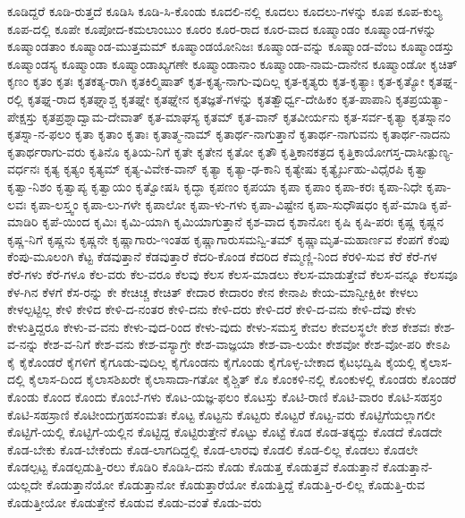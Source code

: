 {ಕೂಡಿದ್ದರೆ
ಕೂಡಿ-ರುತ್ತದೆ
ಕೂಡಿಸಿ
ಕೂಡಿ-ಸಿ-ಕೊಂಡು
ಕೂದಲಿ-ನಲ್ಲಿ
ಕೂದಲು
ಕೂದಲು-ಗಳನ್ನು
ಕೂಪ
ಕೂಪ-ಕುಲ್ಯ
ಕೂಪ-ದಲ್ಲಿ
ಕೂಪೇ
ಕೂಪೋದ-ಕಮಲಾಂಬುಂ
ಕೂರಂ
ಕೂರ-ರಾದ
ಕೂರ-ವಾದ
ಕೂಷ್ಮಾಂಡಂ
ಕೂಷ್ಮಾಂಡ-ಗಳನ್ನು
ಕೂಷ್ಮಾಂಡತಾಂ
ಕೂಷ್ಮಾಂಡ-ಮುತ್ತಮಮ್
ಕೂಷ್ಮಾಂಡಯೋನಿಜಃ
ಕೂಷ್ಮಾಂಡ-ವನ್ನು
ಕೂಷ್ಮಾಂಡ-ವೆಂಬ
ಕೂಷ್ಮಾಂಡಸ್ತು
ಕೂಷ್ಮಾಂಡಸ್ಯ
ಕೂಷ್ಮಾಂಡಾ
ಕೂಷ್ಮಾಂಡಾಖ್ಯಗಣೇ
ಕೂಷ್ಮಾಂಡಾನಾಂ
ಕೂಷ್ಮಾಂಡಾ-ನಾಮ-ದಾನೇನ
ಕೂಷ್ಮಾಂಡೋ
ಕೃಚಿತ್
ಕೃಣಂ
ಕೃತಂ
ಕೃತಃ
ಕೃತಕತ್ಯ-ರಾಗಿ
ಕೃತಕಿಲ್ಮಿಷಾತ್
ಕೃತ-ಕೃತ್ಯ-ನಾಗು-ವುದಿಲ್ಲ
ಕೃತ-ಕೃತ್ಯರು
ಕೃತ-ಕೃತ್ಯಾಃ
ಕೃತ-ಕೃತ್ಯೋ
ಕೃತಘ್ನ-ರಲ್ಲಿ
ಕೃತಘ್ನ-ರಾದ
ಕೃತಘ್ನಾಶ್ಚ
ಕೃತಘ್ನೇ
ಕೃತಘ್ನೇನ
ಕೃತಜ್ಞತೆ-ಗಳನ್ನು
ಕೃತತ್ವೌರ್ಧ್ವ-ದೇಹಿಕಂ
ಕೃತ-ಪಾಪಾನಿ
ಕೃತಪ್ರಯತ್ಯಾ-ಪೇಕ್ಷಸ್ತು
ಕೃತಪ್ರಶ್ನಾದ್ವಾಮ-ದೇವಾತ್
ಕೃತ-ಮಾಘಸ್ಯ
ಕೃತಮ್
ಕೃತ-ವಾನ್
ಕೃತವೀರ್ಯನು
ಕೃತ-ಸರ್ವ-ಕೃತ್ಯಾ
ಕೃತಸ್ನಾನಂ
ಕೃತಸ್ನಾ-ನ-ಫಲಂ
ಕೃತಾ
ಕೃತಾಂ
ಕೃತಾಃ
ಕೃತಾತ್ಮ-ನಾಮ್
ಕೃತಾರ್ಥ-ನಾಗುತ್ತಾನೆ
ಕೃತಾರ್ಥ-ನಾಗುವನು
ಕೃತಾರ್ಥ-ನಾದನು
ಕೃತಾರ್ಥರಾಗು-ವರು
ಕೃತಿನೊ
ಕೃತಿಯ-ನಿಗೆ
ಕೃತೇ
ಕೃತೇನ
ಕೃತೋ
ಕೃತೌ
ಕೃತ್ತಿಕಾನಕತ್ರದ
ಕೃತ್ತಿಕಾಯೋಗಸ್ತ-ದಾಸೀತ್ಪುಣ್ಯ-ವರ್ಧನಃ
ಕೃತ್ಯ
ಕೃತ್ಯಂ
ಕೃತ್ಯಮ್
ಕೃತ್ಯ-ವಿವೇಕ-ವಾನ್
ಕೃತ್ಯಾ
ಕೃತ್ಯಾ-ಢ-ಕಾನಿ
ಕೃತ್ಯೇಷು
ಕೃತ್ಯೈರ್ಬಹು-ವಿಧೈರಪಿ
ಕೃತ್ವಾ
ಕೃತ್ವಾ-ನಿಶಂ
ಕೃತ್ವಾಪ್ಯ
ಕೃತ್ವಾಯಂ
ಕೃತ್ವೋಷಸಿ
ಕೃದ್ಧಾ
ಕೃಪಣಂ
ಕೃಪಯಾ
ಕೃಪಾ
ಕೃಪಾಂ
ಕೃಪಾ-ಕರಃ
ಕೃಪಾ-ನಿಧೇ
ಕೃಪಾ-ಲವಃ
ಕೃಪಾ-ಲಸ್ತ್ವಂ
ಕೃಪಾ-ಲು-ಗಳೇ
ಕೃಪಾಲೋ
ಕೃಪಾ-ಳು-ಗಳು
ಕೃಪಾ-ವಿಷ್ಟೇನ
ಕೃಪಾ-ಸುಧೌಷಧಂ
ಕೃಪೆ-ಮಾಡಿ
ಕೃಪೆ-ಮಾಡಿರಿ
ಕೃಪೆ-ಯಿಂದ
ಕೃಮಿಃ
ಕೃಮಿ-ಯಾಗಿ
ಕೃಮಿಯಾಗುತ್ತಾನೆ
ಕೃಶ-ವಾದ
ಕೃಶಾನೋಃ
ಕೃಷಿ
ಕೃಷಿ-ಪರಃ
ಕೃಷ್ಣ
ಕೃಷ್ಣನ
ಕೃಷ್ಣ-ನಿಗೆ
ಕೃಷ್ಣನು
ಕೃಷ್ಣನೇ
ಕೃಷ್ಣಾಗಾರು-ಇಂತಹ
ಕೃಷ್ಣಾಗಾರುಸಮನ್ವಿ-ತಮ್
ಕೃಷ್ಣಾಮೃತ-ಮಹಾರ್ಣವ
ಕೆಂಪಗೆ
ಕೆಂಪು
ಕೆಂಪು-ಮೂಲಂಗಿ
ಕೆಟ್ಟ
ಕೆಡವುತ್ತಾನೆ
ಕೆಡವುತ್ತಾರೆ
ಕೆದರಿ-ಕೊಂಡ
ಕೆದರಿದ
ಕೆಮ್ಮಣ್ಣಿ-ನಿಂದ
ಕೆರಳಿ-ಸುವ
ಕೆರೆ
ಕೆರೆ-ಗಳ
ಕೆರೆ-ಗಳು
ಕೆರೆ-ಗಳೂ
ಕೆಲ-ವರು
ಕೆಲ-ವರೂ
ಕೆಲವು
ಕೆಲಸ
ಕೆಲಸ-ಮಾಡಲು
ಕೆಲಸ-ಮಾಡುತ್ತೇವೆ
ಕೆಲಸ-ವನ್ನೂ
ಕೆಲಸವೂ
ಕೆಳ-ಗಿನ
ಕೆಳಗೆ
ಕೆಸ-ರನ್ನು
ಕೇ
ಕೇಚಿಚ್ಚ
ಕೇಚಿತ್
ಕೇದಾರ
ಕೇದಾರಂ
ಕೇನ
ಕೇನಾಪಿ
ಕೇಯ-ಮಾನ್ವೀಕ್ಷಿಕೀ
ಕೇಳಲು
ಕೇಳಲ್ಪಟ್ಟಿಲ್ಲ
ಕೇಳಿ
ಕೇಳಿದ
ಕೇಳಿ-ದ-ನಂತರ
ಕೇಳಿ-ದನು
ಕೇಳಿ-ದರು
ಕೇಳಿ-ದರೆ
ಕೇಳಿ-ದ-ವನು
ಕೇಳಿ-ದೆವು
ಕೇಳು
ಕೇಳುತ್ತಿದ್ದರೂ
ಕೇಳು-ವ-ವನು
ಕೇಳು-ವುದ-ರಿಂದ
ಕೇಳು-ವುದು
ಕೇಳು-ಸಮಸ್ತ
ಕೇವಲ
ಕೇವಲಸ್ಥಲೇ
ಕೇಶ
ಕೇಶವಃ
ಕೇಶ-ವ-ನನ್ನು
ಕೇಶ-ವ-ನಿಗೆ
ಕೇಶ-ವನು
ಕೇಶ-ವಸ್ಯಾಗ್ರೇ
ಕೇಶ-ವಾಜ್ಞಯಾ
ಕೇಶ-ವಾ-ಲಯೇ
ಕೇಶವೋ
ಕೇಶ-ವೋ-ಪರಿ
ಕೇಽಪಿ
ಕೈ
ಕೈಕೊಂಡರೆ
ಕೈಗಳಿಗೆ
ಕೈಗೂಡು-ವುದಿಲ್ಲ
ಕೈಗೊಂಡನು
ಕೈಗೊಂಡು
ಕೈಗೊಳ್ಳ-ಬೇಕಾದ
ಕೈಟಭದ್ವಿಷಿ
ಕೈಯಲ್ಲಿ
ಕೈಲಾಸ-ದಲ್ಲಿ
ಕೈಲಾಸ-ದಿಂದ
ಕೈಲಾಸಶಿಖರೇ
ಕೈಲಾಸಾದಾ-ಗತೋ
ಕೈಶ್ಚಿತ್
ಕೊ
ಕೊಂಕಳಿ-ನಲ್ಲಿ
ಕೊಂಕುಳಲ್ಲಿ
ಕೊಂಡರು
ಕೊಂಡರೆ
ಕೊಂಡು
ಕೊಂದ
ಕೊಂದು
ಕೊಂಬೆ-ಗಳು
ಕೊಟ-ಯಜ್ಞ-ಫಲಂ
ಕೊಟಸ್ತು
ಕೊಟಿ-ರಾಣಿ
ಕೊಟಿ-ವಾರಂ
ಕೊಟಿ-ಸಹಸ್ರಂ
ಕೊಟಿ-ಸಹಸ್ರಾಣಿ
ಕೊಟೀಂದುಗ್ರಹಸಂಮತಃ
ಕೊಟ್ಟ
ಕೊಟ್ಟನು
ಕೊಟ್ಟರು
ಕೊಟ್ಟರೆ
ಕೊಟ್ಟ-ವರು
ಕೊಟ್ಟಿಗೆಯಲ್ಲಾಗಲೀ
ಕೊಟ್ಟಿಗೆ-ಯಲ್ಲಿ
ಕೊಟ್ಟಿಗೆ-ಯಲ್ಲಿನ
ಕೊಟ್ಟಿದ್ದ
ಕೊಟ್ಟಿರುತ್ತೇನೆ
ಕೊಟ್ಟು
ಕೊಟ್ಟೆ
ಕೊಡ
ಕೊಡ-ತಕ್ಕದ್ದು
ಕೊಡದೆ
ಕೊಡದೇ
ಕೊಡ-ಬೇಕು
ಕೊಡ-ಬೇಕೆಂದು
ಕೊಡ-ಲಾಗದಿದ್ದಲ್ಲಿ
ಕೊಡ-ಲಾರವು
ಕೊಡಲಿ
ಕೊಡ-ಲಿಲ್ಲ
ಕೊಡಲು
ಕೊಡಲೇ
ಕೊಡಲ್ಪಟ್ಟ
ಕೊಡಲ್ಪಡುತ್ತಿ-ರಲು
ಕೊಡಿರಿ
ಕೊಡಿಸಿ-ದನು
ಕೊಡು
ಕೊಡುತ್ತ
ಕೊಡುತ್ತವೆ
ಕೊಡುತ್ತಾನೆ
ಕೊಡುತ್ತಾನೆ-ಯಲ್ಲದೇ
ಕೊಡುತ್ತಾನೆಯೋ
ಕೊಡುತ್ತಾನೋ
ಕೊಡುತ್ತಾರೆಯೋ
ಕೊಡುತ್ತಿದ್ದೆ
ಕೊಡುತ್ತಿ-ರ-ಲಿಲ್ಲ
ಕೊಡುತ್ತಿ-ರುವ
ಕೊಡುತ್ತೀಯೋ
ಕೊಡುತ್ತೇನೆ
ಕೊಡುವ
ಕೊಡು-ವಂತೆ
ಕೊಡು-ವರು
}
